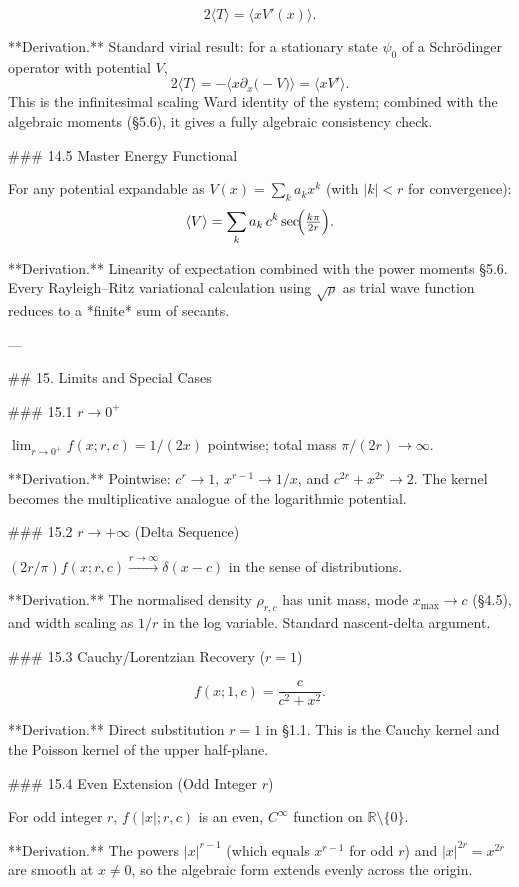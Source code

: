 $$
2\langle T\rangle = \langle x V'(x)\rangle.
$$

**Derivation.** Standard virial result: for a stationary state $\psi_{0}$ of a Schrödinger operator with potential $V$,
$$
2\langle T\rangle = -\langle x\partial_{x}\bigl(-V\bigr)\rangle = \langle xV'\rangle.
$$
This is the infinitesimal scaling Ward identity of the system; combined with the algebraic moments (§5.6), it gives a fully algebraic consistency check.

### 14.5 Master Energy Functional

For any potential expandable as $V(x) = \sum_{k}a_{k}x^{k}$ (with $|k|<r$ for convergence):
$$
\langle V\rangle = \sum_{k}a_{k}\,c^{k}\sec\!\Bigl(\tfrac{k\pi}{2r}\Bigr).
$$

**Derivation.** Linearity of expectation combined with the power moments §5.6. Every Rayleigh–Ritz variational calculation using $\sqrt\rho$ as trial wave function reduces to a *finite* sum of secants.

---

## 15. Limits and Special Cases

### 15.1 $r\to 0^{+}$

$\lim_{r\to 0^{+}}f(x;r,c) = 1/(2x)$ pointwise; total mass $\pi/(2r)\to\infty$.

**Derivation.** Pointwise: $c^{r}\to 1$, $x^{r-1}\to 1/x$, and $c^{2r}+x^{2r}\to 2$. The kernel becomes the multiplicative analogue of the logarithmic potential.

### 15.2 $r\to+\infty$ (Delta Sequence)

$(2r/\pi)f(x;r,c) \xrightarrow{r\to\infty}\delta(x-c)$ in the sense of distributions.

**Derivation.** The normalised density $\rho_{r,c}$ has unit mass, mode $x_{\max}\to c$ (§4.5), and width scaling as $1/r$ in the log variable. Standard nascent-delta argument.

### 15.3 Cauchy/Lorentzian Recovery ($r=1$)

$$
f(x;1,c) = \frac{c}{c^{2}+x^{2}}.
$$

**Derivation.** Direct substitution $r=1$ in §1.1. This is the Cauchy kernel and the Poisson kernel of the upper half‑plane.

### 15.4 Even Extension (Odd Integer $r$)

For odd integer $r$, $f(|x|;r,c)$ is an even, $C^{\infty}$ function on $\mathbb R\setminus\{0\}$.

**Derivation.** The powers $|x|^{r-1}$ (which equals $x^{r-1}$ for odd $r$) and $|x|^{2r}=x^{2r}$ are smooth at $x\ne 0$, so the algebraic form extends evenly across the origin.

